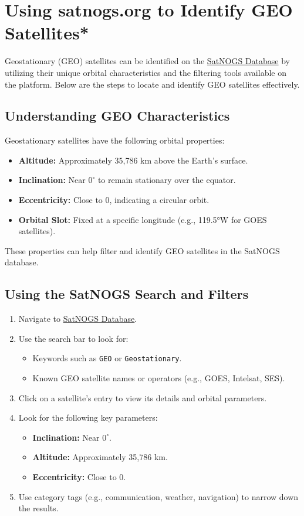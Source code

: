 % 

\section{Using satnogs.org to Identify GEO Satellites*}

Geostationary (GEO) satellites can be identified on the \href{https://db.satnogs.org/}{SatNOGS Database} by utilizing their unique orbital characteristics and the filtering tools available on the platform. Below are the steps to locate and identify GEO satellites effectively.
\subsection{Understanding GEO Characteristics}
Geostationary satellites have the following orbital properties:
\begin{itemize}
    \item \textbf{Altitude:} Approximately 35,786 km above the Earth's surface.
    \item \textbf{Inclination:} Near $0^\circ$ to remain stationary over the equator.
    \item \textbf{Eccentricity:} Close to 0, indicating a circular orbit.
    \item \textbf{Orbital Slot:} Fixed at a specific longitude (e.g., 119.5°W for GOES satellites).
\end{itemize}

These properties can help filter and identify GEO satellites in the SatNOGS database.

\subsection{Using the SatNOGS Search and Filters}
\begin{enumerate}
    \item Navigate to \href{https://db.satnogs.org/}{SatNOGS Database}.
    \item Use the search bar to look for:
    \begin{itemize}
        \item Keywords such as \texttt{GEO} or \texttt{Geostationary}.
        \item Known GEO satellite names or operators (e.g., GOES, Intelsat, SES).
    \end{itemize}
    \item Click on a satellite’s entry to view its details and orbital parameters.
    \item Look for the following key parameters:
    \begin{itemize}
        \item \textbf{Inclination:} Near $0^\circ$.
        \item \textbf{Altitude:} Approximately 35,786 km.
        \item \textbf{Eccentricity:} Close to 0.
    \end{itemize}
    \item Use category tags (e.g., communication, weather, navigation) to narrow down the results.
\end{enumerate}

